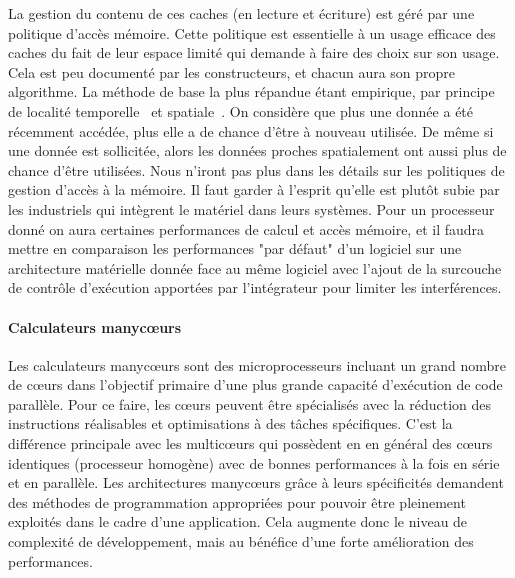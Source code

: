 \documentclass[french, a4paper, 11pt, twoside, pdftex]{StyleThese}
\begin{document}
		La gestion du contenu de ces caches (en lecture et écriture) est géré par une politique d'accès mémoire. Cette politique est essentielle à un usage efficace des caches du fait de leur espace limité qui demande à faire des choix sur son usage. Cela est peu documenté par les constructeurs, et chacun aura son propre algorithme.
		La méthode de base la plus répandue étant empirique, par principe de localité temporelle~\cite{durrieu_predictable_2014} et spatiale~\cite{wilkes_slave_1965}. On considère que plus une donnée a été récemment accédée, plus elle a de chance d'être à nouveau utilisée. De même si une donnée est sollicitée, alors les données proches spatialement ont aussi plus de chance d'être utilisées. 
		Nous n'iront pas plus dans les détails sur les politiques de gestion d'accès à la mémoire. Il faut garder à l'esprit qu'elle est plutôt subie par les industriels qui intègrent le matériel dans leurs systèmes. Pour un processeur donné on aura certaines performances de calcul et accès mémoire, et il faudra mettre en comparaison les performances "par défaut" d'un logiciel sur une architecture matérielle donnée face au même logiciel avec l'ajout de la surcouche de contrôle d'exécution apportées par l'intégrateur pour limiter les interférences.


		\paragraph{Calculateurs manycœurs}	Les calculateurs manycœurs sont des microprocesseurs incluant un grand nombre de cœurs dans l'objectif primaire d'une plus grande capacité d'exécution de code parallèle. Pour ce faire, les cœurs peuvent être spécialisés avec la réduction des instructions réalisables et optimisations à des tâches spécifiques. C'est la différence principale avec les multicœurs qui possèdent en en général des cœurs identiques (processeur homogène) avec de bonnes performances à la fois en série et en parallèle. 
		Les architectures manycœurs grâce à leurs spécificités demandent  des méthodes de programmation appropriées pour pouvoir être pleinement exploités dans le cadre d'une application. Cela augmente donc le niveau de complexité de développement, mais au bénéfice d'une forte amélioration des performances.
		
\end{document}
